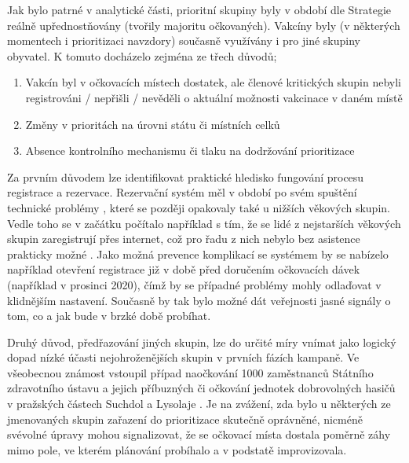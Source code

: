 Jak bylo patrné v analytické části, prioritní skupiny byly v období dle Strategie reálně upřednostňovány (tvořily majoritu očkovaných). Vakcíny byly (v některých momentech i prioritizaci navzdory) současně využívány i pro jiné skupiny obyvatel. K tomuto docházelo zejména ze třech důvodů;
%
\begin{enumerate}
\item Vakcín byl v očkovacích místech dostatek, ale členové kritických skupin nebyli registrováni / nepřišli / nevěděli o aktuální možnosti vakcinace v daném místě \cite{logo_nahoda, lochar_karban} 
\item Změny v prioritách na úrovni státu či místních celků \cite{logo_logistika, logo_pardubice}
\item Absence kontrolního mechanismu či tlaku na dodržování prioritizace \cite{logo_predbihani, lochar_karban}
\end{enumerate}

Za prvním důvodem lze identifikovat praktické hledisko fungování procesu registrace a rezervace.
Rezervační systém měl v období po svém spuštění technické problémy \cite{logoc_seniori_zapsani, logoc_stres}, které se později opakovaly také u nižších věkových skupin. 
Vedle toho se v začátku počítalo například s tím, že se lidé z nejstarších věkových skupin zaregistrují přes internet, což pro řadu z nich nebylo bez asistence prakticky možné \cite{seniori_registrace_internet}.
%
Jako možná prevence komplikací se systémem by se nabízelo například otevření registrace již v době před doručením očkovacích dávek (například v prosinci 2020), čímž by se případné problémy mohly odlaďovat v klidnějším nastavení. %
Současně by tak bylo možné dát veřejnosti jasné signály o tom, co a jak bude v brzké době probíhat.

Druhý důvod, předřazování jiných skupin, lze do určité míry vnímat jako logický dopad nízké účasti nejohroženějších skupin v prvních fázích kampaně.
%
Ve všeobecnou známost vstoupil případ naočkování 1000 zaměstnanců Státního zdravotního ústavu a jejich příbuzných či očkování jednotek dobrovolných hasičů v pražských částech Suchdol a Lysolaje \cite{logoc_nebudu, logoc_hasici}. Je na zvážení, zda bylo u některých ze jmenovaných skupin zařazení do prioritizace skutečně oprávněné, nicméně svévolné úpravy mohou signalizovat, že se očkovací místa dostala poměrně záhy mimo pole, ve kterém plánování probíhalo a v podstatě improvizovala. 

